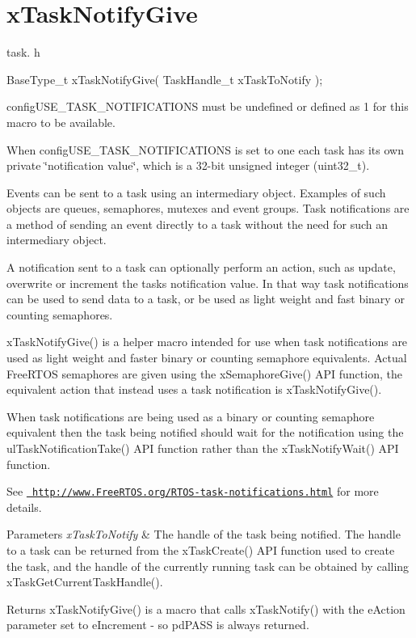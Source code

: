 \hypertarget{group__x_task_notify_give}{}\section{x\+Task\+Notify\+Give}
\label{group__x_task_notify_give}
task. h 
\begin{DoxyPre}BaseType\_t xTaskNotifyGive( TaskHandle\_t xTaskToNotify );\end{DoxyPre}


config\+U\+S\+E\+\_\+\+T\+A\+S\+K\+\_\+\+N\+O\+T\+I\+F\+I\+C\+A\+T\+I\+O\+NS must be undefined or defined as 1 for this macro to be available.

When config\+U\+S\+E\+\_\+\+T\+A\+S\+K\+\_\+\+N\+O\+T\+I\+F\+I\+C\+A\+T\+I\+O\+NS is set to one each task has its own private \char`\"{}notification value\char`\"{}, which is a 32-\/bit unsigned integer (uint32\+\_\+t).

Events can be sent to a task using an intermediary object. Examples of such objects are queues, semaphores, mutexes and event groups. Task notifications are a method of sending an event directly to a task without the need for such an intermediary object.

A notification sent to a task can optionally perform an action, such as update, overwrite or increment the task\textquotesingle{}s notification value. In that way task notifications can be used to send data to a task, or be used as light weight and fast binary or counting semaphores.

x\+Task\+Notify\+Give() is a helper macro intended for use when task notifications are used as light weight and faster binary or counting semaphore equivalents. Actual Free\+R\+T\+OS semaphores are given using the x\+Semaphore\+Give() A\+PI function, the equivalent action that instead uses a task notification is x\+Task\+Notify\+Give().

When task notifications are being used as a binary or counting semaphore equivalent then the task being notified should wait for the notification using the ul\+Task\+Notification\+Take() A\+PI function rather than the x\+Task\+Notify\+Wait() A\+PI function.

See \href{http://www.FreeRTOS.org/RTOS-task-notifications.html}{\texttt{ http\+://www.\+Free\+R\+T\+O\+S.\+org/\+R\+T\+O\+S-\/task-\/notifications.\+html}} for more details.


\begin{DoxyParams}{Parameters}
{\em x\+Task\+To\+Notify} & The handle of the task being notified. The handle to a task can be returned from the x\+Task\+Create() A\+PI function used to create the task, and the handle of the currently running task can be obtained by calling x\+Task\+Get\+Current\+Task\+Handle().\\
\hline
\end{DoxyParams}
\begin{DoxyReturn}{Returns}
x\+Task\+Notify\+Give() is a macro that calls x\+Task\+Notify() with the e\+Action parameter set to e\+Increment -\/ so pd\+P\+A\+SS is always returned. 
\end{DoxyReturn}
